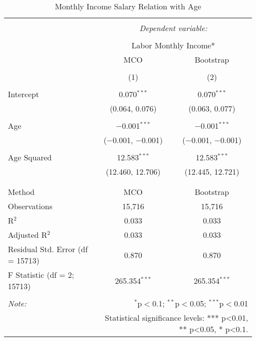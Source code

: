 
\begin{table}[!htbp] \centering 
  \caption{Monthly Income Salary Relation with Age} 
  \label{} 
\begin{tabular}{@{\extracolsep{5pt}}lcc} 
\\[-1.8ex]\hline 
\hline \\[-1.8ex] 
 & \multicolumn{2}{c}{\textit{Dependent variable:}} \\ 
\cline{2-3} 
\\[-1.8ex] & \multicolumn{2}{c}{Labor Monthly Income*} \\ 
 & MCO & Bootstrap \\ 
\\[-1.8ex] & (1) & (2)\\ 
\hline \\[-1.8ex] 
 Intercept & 0.070$^{***}$ & 0.070$^{***}$ \\ 
  & (0.064, 0.076) & (0.063, 0.077) \\ 
  & & \\ 
 Age & $-$0.001$^{***}$ & $-$0.001$^{***}$ \\ 
  & ($-$0.001, $-$0.001) & ($-$0.001, $-$0.001) \\ 
  & & \\ 
 Age Squared & 12.583$^{***}$ & 12.583$^{***}$ \\ 
  & (12.460, 12.706) & (12.445, 12.721) \\ 
  & & \\ 
\hline \\[-1.8ex] 
Method & MCO & Bootstrap \\ 
Observations & 15,716 & 15,716 \\ 
R$^{2}$ & 0.033 & 0.033 \\ 
Adjusted R$^{2}$ & 0.033 & 0.033 \\ 
Residual Std. Error (df = 15713) & 0.870 & 0.870 \\ 
F Statistic (df = 2; 15713) & 265.354$^{***}$ & 265.354$^{***}$ \\ 
\hline 
\hline \\[-1.8ex] 
\textit{Note:}  & \multicolumn{2}{r}{$^{*}$p$<$0.1; $^{**}$p$<$0.05; $^{***}$p$<$0.01} \\ 
 & \multicolumn{2}{r}{Statistical significance levels: *** p<0.01, ** p<0.05, * p<0.1.} \\ 
\end{tabular} 
\end{table} 
